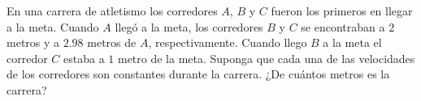 En una carrera de atletismo los corredores $A$, $B$ y $C$ fueron los primeros en llegar a la meta. Cuando $A$ llegó a la meta, los corredores $B$ y $C$ se encontraban a $2$ metros y a $2.98$ metros de $A$, respectivamente. Cuando llego $B$ a la meta el corredor $C$ estaba a $1$ metro de la meta. Suponga que cada una de las velocidades de los corredores son constantes durante la carrera. ¿De cuántos metros es la carrera?